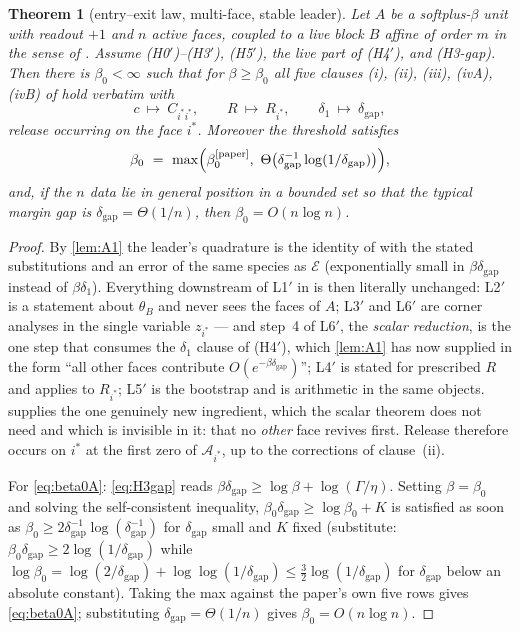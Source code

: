 \documentclass[11pt]{article}
\newtheorem{theorem}{Theorem}
\theoremstyle{remark}
\newcommand{\Ar}{\mathcal{A}}
\newcommand{\dgap}{\delta_{\mathrm{gap}}}
\newcommand{\hyplabel}[1]{\textup{(#1)}}
\begin{document}
\begin{theorem}[entry--exit law, multi-face, stable leader]\label{thm:A}
Let $A$ be a softplus-$\beta$ unit with readout $+1$ and $n$ active faces,
coupled to a live block $B$ affine of order $m$ in the sense of
\cite[\S3.1]{paper}. Assume \hyplabel{H0$'$}--\hyplabel{H3$'$},
\hyplabel{H5$'$}, the live part of \hyplabel{H4$'$}, and \hyplabel{H3-gap}.
Then there is $\beta_0<\infty$ such that for $\beta\ge\beta_0$ all five clauses
\textup{(i)}, \textup{(ii)}, \textup{(iii)}, \textup{(ivA)}, \textup{(ivB)} of
\cite[Thm.~6]{paper} hold verbatim with
\[
c\ \longmapsto\ C_{i^\ast i^\ast},\qquad
R\ \longmapsto\ R_{i^\ast},\qquad
\delta_1\ \longmapsto\ \dgap ,
\]
release occurring on the face $i^\ast$. Moreover the threshold satisfies
\begin{equation}\label{eq:beta0A}
\beta_0\ =\ \max\Bigl(\beta_0^{\text{\cite{paper}}},\
\Theta\bigl(\dgap^{-1}\log(1/\dgap)\bigr)\Bigr),
\end{equation}
and, if the $n$ data lie in general position in a bounded set so that the
typical margin gap is $\dgap=\Theta(1/n)$, then $\beta_0=O(n\log n)$.
\end{theorem}

\begin{proof}
By \cref{lem:A1} the leader's quadrature is the identity of
\cite[L1$'$]{paper} with the stated substitutions and an error of the same
species as $\mathcal E$ (exponentially small in $\beta\dgap$ instead of
$\beta\delta_1$). Everything downstream of L1$'$ in \cite[App.~B]{paper} is then
literally unchanged: L2$'$ is a statement about $\theta_B$ and never sees the
faces of $A$; L3$'$ and L6$'$ are corner analyses in the single variable
$z_{i^\ast}$ --- and step~4 of L6$'$, the \emph{scalar reduction}, is the one
step that consumes the $\delta_1$ clause of \hyplabel{H4$'$}, which
\cref{lem:A1} has now supplied in the form ``all other faces contribute
$O(e^{-\beta\dgap})$''; L4$'$ is stated for prescribed $R$ and applies to
$R_{i^\ast}$; L5$'$ is the bootstrap and is arithmetic in the same objects.
\Cref{lem:A2} supplies the one genuinely new ingredient, which the scalar
theorem does not need and which is invisible in it: that no \emph{other} face
revives first. Release therefore occurs on $i^\ast$ at the first zero of
$\Ar_{i^\ast}$, up to the corrections of clause~(ii).

For \eqref{eq:beta0A}: \eqref{eq:H3gap} reads
$\beta\dgap\ge\log\beta+\log(\Gamma/\eta)$. Setting $\beta=\beta_0$ and solving
the self-consistent inequality, $\beta_0\dgap\ge\log\beta_0+K$ is satisfied as
soon as $\beta_0\ge2\dgap^{-1}\log(\dgap^{-1})$ for $\dgap$ small and $K$ fixed
(substitute: $\beta_0\dgap\ge2\log(1/\dgap)$ while
$\log\beta_0=\log(2/\dgap)+\log\log(1/\dgap)\le
\tfrac32\log(1/\dgap)$ for $\dgap$ below an absolute constant). Taking the max
against the paper's own five rows gives \eqref{eq:beta0A}; substituting
$\dgap=\Theta(1/n)$ gives $\beta_0=O(n\log n)$.
\end{proof}
\end{document}
